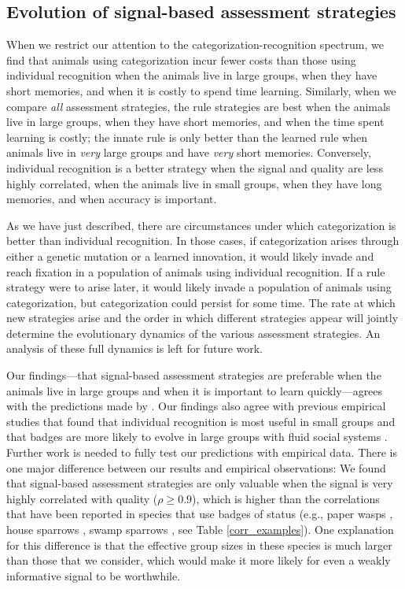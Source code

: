 \subsection*{Evolution of signal-based assessment strategies }

When we restrict our attention to the categorization-recognition spectrum, we find that animals using categorization incur fewer costs than those using individual recognition when the animals live in large groups, when they have short memories, and when it is costly to spend time learning. Similarly, when we compare \emph{all} assessment strategies, the rule strategies are best when the animals live in large groups, when they have short memories, and when the time spent learning is costly; the innate rule is only better than the learned rule when animals live in \emph{very} large groups and have \emph{very} short memories. Conversely, individual recognition is a better strategy when the signal and quality are less highly correlated, when the animals live in small groups, when they have long memories, and when accuracy is important. 

As we have just described, there are circumstances under which categorization is better than individual recognition. In those cases, if categorization arises through either a genetic mutation or a learned innovation, it would likely invade and reach fixation in a population of animals using individual recognition. If a rule strategy were to arise later, it would likely invade a population of animals using categorization, but categorization could persist for some time. The rate at which new strategies arise and the order in which different strategies appear will jointly determine the evolutionary dynamics of the various assessment strategies. An analysis of these full dynamics is left for future work. 

Our findings---that signal-based assessment strategies are preferable when the animals live in large groups and when it is important to learn quickly---agrees with the predictions made by \citet{sheehan2016evotradeoff}. Our findings also agree with previous empirical studies that found that individual recognition is most useful in small groups \citep{Veiga:1993fk} and that badges are more likely to evolve in large groups with fluid social systems \citep{Rohwer:1975fk,Tibbetts:2009kx}. Further work is needed to fully test our predictions with empirical data. There is one major difference between our results and empirical observations: We found that signal-based assessment strategies are only valuable when the signal is very highly correlated with quality ($\rho\geq 0.9$), which is higher than the correlations that have been reported in species that use badges of status (e.g., paper wasps \citep{Tibbetts:2004kx}, house sparrows \citep{Veiga:1993fk}, swamp sparrows \citep{Olsen:2010uq}, see Table \ref{corr_examples}). One explanation for this difference is that the effective group sizes in these species is much larger than those that we consider, which would make it more likely for even a weakly informative signal to be worthwhile. 

